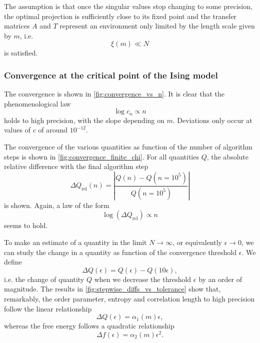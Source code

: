 The assumption is that once the singular values stop changing to some precision, the optimal projection is sufficiently
close to its fixed point and the transfer matrices $A$ and $T$ represent an environment only limited by the length scale
given by $m$, i.e.
\begin{equation}
  \xi(m) \ll N
\end{equation}
is satisfied.

\subsubsection{Convergence at the critical point of the Ising model}
The convergence is shown in \autoref{fig:convergence_vs_n}. It is clear that the
phenomenological law
\begin{equation}\label{eq:convergence_vs_n_semilogarithmic_law}
  \log c_n \propto n
\end{equation}
holds to high precision, with the slope depending on $m$.
Deviations only occur at values of $c$ of around $10^{-12}$.

The convergence of the various quantities as function of the number of algorithm steps is shown in
\autoref{fig:convergence_finite_chi}. For all quantities $Q$, the absolute relative difference
with the final algorithm step
\begin{equation}\label{eq:abs_rel_diff}
  \Delta Q_{\text{rel}}(n) = \left| \frac{Q(n) - Q(n = 10^5)}{Q(n = 10^5)} \right|
\end{equation}
is shown. Again, a law of the form
\begin{equation}\label{eq:abs_rel_diff_vs_n_semilogarithmic_law}
  \log(\Delta Q_{\text{rel}}) \propto n
\end{equation}
seems to hold.

To make an estimate of a quantity in the limit $N \to \infty$, or equivalently $\epsilon \to 0$,
we can study the change in a quantity as function of the convergence threshold $\epsilon$. We define
\begin{equation}\label{eq:stepwise_difference_epsilon}
  \Delta Q(\epsilon) = Q(\epsilon) - Q(10\epsilon),
\end{equation}
i.e. the change of quantity $Q$ when we decrease the threshold $\epsilon$ by an order of magnitude. The results in
\autoref{fig:stepwise_diffs_vs_tolerance} show that, remarkably, the order parameter, entropy and correlation length
to high precision follow the linear relationship
\begin{equation}\label{eq:stepwise_difference_linear}
  \Delta Q(\epsilon) = \alpha_1(m) \epsilon,
\end{equation}
whereas the free energy follows a quadratic relationship
\begin{equation}\label{eq:stepwise_difference_quadratic}
  \Delta f(\epsilon) = \alpha_2(m) \epsilon^2.
\end{equation}

